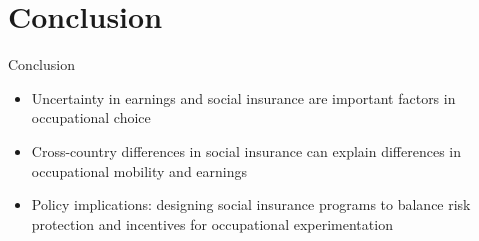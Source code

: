 \documentclass{beamer}
\begin{document}
\section{Conclusion}

\begin{frame}{Conclusion}
  \begin{itemize}
    \item Uncertainty in earnings and social insurance are important factors in occupational choice 
    \item Cross-country differences in social insurance can explain differences in occupational mobility and earnings
    \item Policy implications: designing social insurance programs to balance risk protection and incentives for occupational experimentation
  \end{itemize}
\end{frame}
\end{document}
